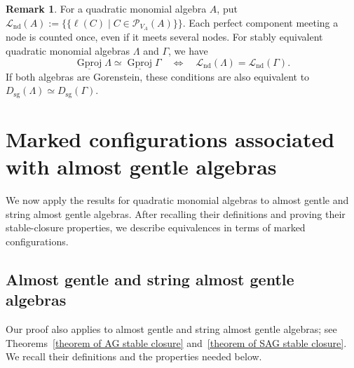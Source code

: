 \documentclass[11pt]{article}
\providecommand{\varLambda}{\Lambda}
\providecommand{\varGamma}{\Gamma}
\theoremstyle{definition}
\newtheorem{remark}[theorem]{Remark}
\begin{document}
			\begin{remark}
				\label{remark of stable Gorenstein periods}
				For a quadratic monomial algebra $A$, put $\mathcal L_{\mathrm{nd}}(A):=
				\{\!\{\ell(C)\mid C\in\mathcal P_{V_A}(A)\}\!\}$. Each perfect component meeting a node is counted once, even if it meets several nodes. For stably equivalent quadratic monomial algebras $\varLambda$ and $\varGamma$, we have
				\[
					\underline{\operatorname{Gproj}}\varLambda
					\simeq
					\underline{\operatorname{Gproj}}\varGamma
					\quad\Longleftrightarrow\quad
					\mathcal L_{\mathrm{nd}}(\varLambda)
					=
					\mathcal L_{\mathrm{nd}}(\varGamma).
				\]
				If both algebras are Gorenstein, these conditions are also equivalent to $D_{\mathrm{sg}}(\varLambda)\simeq D_{\mathrm{sg}}(\varGamma)$.
			\end{remark}




\section{Marked configurations associated with almost gentle algebras}\label{section of marked configurations}

	We now apply the results for quadratic monomial algebras to almost gentle and string almost gentle algebras. After recalling their definitions and proving their stable-closure properties, we describe equivalences in terms of marked configurations.


	\subsection{Almost gentle and string almost gentle algebras}\label{subsection of almost gentle algebras}

		Our proof also applies to almost gentle and string almost gentle algebras; see Theorems~{\ref{theorem of AG stable closure}} and~{\ref{theorem of SAG stable closure}}.
		We recall their definitions and the properties needed below.
\end{document}
